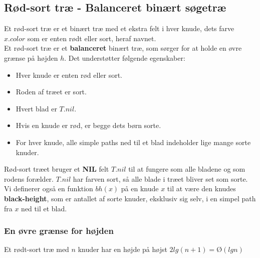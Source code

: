 \subsection{Rød-sort træ - Balanceret binært søgetræ}
Et rød-sort træ er et binært træ med et ekstra felt i hver knude, dets farve $x.color$ som er enten rødt eller sort, heraf navnet.\\
Et rød-sort træ er et \textbf{balanceret} binært træ, som sørger for at holde en øvre grænse på højden $h$. Det understøtter følgende egenskaber:
\begin{itemize}
\item Hver knude er enten rød eller sort.
\item Roden af træet er sort.
\item Hvert blad er $T.nil$.
\item Hvis en knude er rød, er begge dets børn sorte.
\item For hver knude, alle simple paths ned til et blad indeholder lige mange sorte knuder.
\end{itemize}
Rød-sort træet bruger et \textbf{NIL} felt $T.nil$ til at fungere som alle bladene og som rodens forælder. $T.nil$ har farven sort, så alle blade i træet bliver set som sorte.\\

Vi definerer også en funktion $bh(x)$ på en knude $x$ til at være den knudes \textbf{black-height}, som er antallet af sorte knuder, eksklusiv sig selv, i en simpel path fra $x$ ned til et blad.\\

\subsubsection{En øvre grænse for højden}
\begin{lemma}
  Et rødt-sort træ med $n$ knuder har en højde på højst $2lg(n+1) = Ø(lgn)$
\end{lemma}

